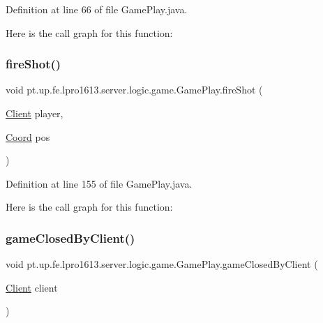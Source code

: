 Definition at line 66 of file Game\+Play.\+java.

Here is the call graph for this function\+:
\hypertarget{classpt_1_1up_1_1fe_1_1lpro1613_1_1server_1_1logic_1_1game_1_1_game_play_aa8ed98597766510e3ba9f804c61cded8}{}\label{classpt_1_1up_1_1fe_1_1lpro1613_1_1server_1_1logic_1_1game_1_1_game_play_aa8ed98597766510e3ba9f804c61cded8} 
\subsubsection{\texorpdfstring{fire\+Shot()}{fireShot()}}
{\footnotesize\ttfamily void pt.\+up.\+fe.\+lpro1613.\+server.\+logic.\+game.\+Game\+Play.\+fire\+Shot (\begin{DoxyParamCaption}\item[{\hyperlink{classpt_1_1up_1_1fe_1_1lpro1613_1_1server_1_1conn_1_1_client}{Client}}]{player,  }\item[{\hyperlink{classpt_1_1up_1_1fe_1_1lpro1613_1_1sharedlib_1_1utils_1_1_coord}{Coord}}]{pos }\end{DoxyParamCaption})}



Definition at line 155 of file Game\+Play.\+java.

Here is the call graph for this function\+:
\hypertarget{classpt_1_1up_1_1fe_1_1lpro1613_1_1server_1_1logic_1_1game_1_1_game_play_a2456fd5c4981a6e04553bb77b749041c}{}\label{classpt_1_1up_1_1fe_1_1lpro1613_1_1server_1_1logic_1_1game_1_1_game_play_a2456fd5c4981a6e04553bb77b749041c} 
\subsubsection{\texorpdfstring{game\+Closed\+By\+Client()}{gameClosedByClient()}}
{\footnotesize\ttfamily void pt.\+up.\+fe.\+lpro1613.\+server.\+logic.\+game.\+Game\+Play.\+game\+Closed\+By\+Client (\begin{DoxyParamCaption}\item[{\hyperlink{classpt_1_1up_1_1fe_1_1lpro1613_1_1server_1_1conn_1_1_client}{Client}}]{client }\end{DoxyParamCaption})}



